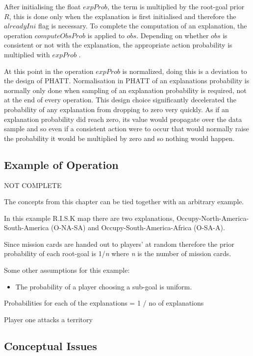 \documentclass[parskip]{cs4rep}
\begin{document}
After initialising the float $expProb$, the term is multiplied by the root-goal prior $R$, this is done only when the explanation is first initialised and therefore the $alreadyIni$ flag is necessary. To complete the computation of an explanation, the operation $computeObsProb$ is applied to $obs$. Depending on whether $obs$ is consistent or not with the explanation, the appropriate action probability is multiplied with $expProb$ .

At this point in the operation $expProb$ is normalized, doing this is a deviation to the design of PHATT. Normalisation in PHATT of an explanations probability is normally only done when sampling of an explanation probability is required, not at the end of every operation. This design choice significantly decelerated the probability of any explanation from dropping to zero very quickly. As if an explanation probability did reach zero, its value would propagate over the data sample and so even if a consistent action were to occur that would normally raise the probability it would be multiplied by zero and so nothing would happen. 

\subsection{Example of Operation}

NOT COMPLETE

The concepts from this chapter can be tied together with an arbitrary example.

In this example R.I.S.K map there are two explanations, Occupy-North-America-South-America (O-NA-SA) and Occupy-South-America-Africa (O-SA-A). 

Since mission cards are handed out to players' at random therefore the prior probability of each root-goal is 1/\textit{n} where \textit{n} is the number of mission cards. 

Some other assumptions for this example:

\begin{itemize}
\item
The probability of a player choosing a sub-goal is uniform.
\end{itemize}

Probabilities for each of the explanations = 1 / no of explanations

Player one attacks a territory 

\subsection{Conceptual Issues}
\end{document}
